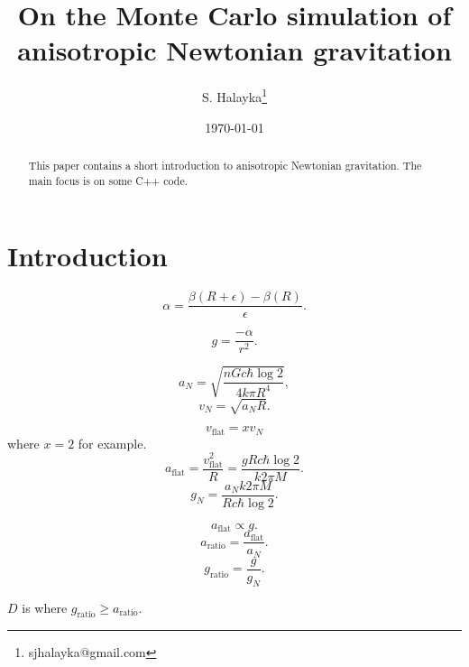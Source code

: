 \documentclass[12pt]{article}
\title{On the Monte Carlo simulation of anisotropic Newtonian gravitation}
\author{S. Halayka\footnote{sjhalayka@gmail.com}}
\date{\today\;\currenttime}
\begin{document}
 
\maketitle

\begin{abstract}
This paper contains a short introduction to anisotropic Newtonian gravitation.
The main focus is on some C++ code.
\end{abstract}



\section{Introduction}

\begin{equation}
\alpha = \frac{\beta(R + \epsilon) - \beta(R)}{\epsilon}.
\end{equation}

\begin{equation}
g = \frac{-\alpha}{r^2}. 
\end{equation}

\begin{equation}
a_N = \sqrt{\frac{n G c \hbar \log 2}{4 k \pi R^4}},
\end{equation}
\begin{equation}
v_N = \sqrt{a_N R}.
\end{equation}

\begin{equation}
v_{\textrm{flat}} = x v_N
\end{equation}
where $x = 2$ for example.
\begin{equation}
a_{\textrm{flat}} = \frac{v_{\textrm{flat}}^2}{R} = \frac{g R c \hbar \log 2}{k 2 \pi M}.
\end{equation}
\begin{equation}
g_N = \frac{a_N k 2 \pi M}{R c \hbar \log 2}. 
\end{equation}



\begin{equation}
a_{\textrm{flat}} \propto g.
\end{equation}
\begin{equation}
a_{\textrm{ratio}} = \frac{a_{\textrm{flat}}}{a_N}. 
\end{equation}
\begin{equation}
g_{\textrm{ratio}} = \frac{g}{g_N}. 
\end{equation}

$D$ is where $g_{\textrm{ratio}} \geq a_{\textrm{ratio}}$.
\end{document}
